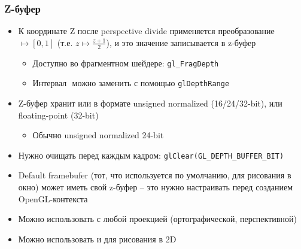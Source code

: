 \documentclass{beamer}
\begin{document}
\begin{frame}[fragile]
\frametitle{Z-буфер}
\begin{itemize}
\item К координате Z после perspective divide применяется преобразование \begin{math}[-1, 1] \mapsto [0, 1]\end{math} (т.е. \begin{math}z \mapsto \frac{z+1}{2}\end{math}), и это значение записывается в z-буфер
\pause
\begin{itemize}
\item Доступно во фрагментном шейдере: \verb|gl_FragDepth|
\pause
\item Интервал \begin{math}[0, 1]\end{math} можно заменить с помощью \verb|glDepthRange|
\end{itemize}
\pause
\item Z-буфер хранит или в формате unsigned normalized (16/24/32-bit), или floating-point (32-bit)
\begin{itemize}
\item Обычно unsigned normalized 24-bit
\end{itemize}
\pause
\item Нужно очищать перед каждым кадром: \verb|glClear(GL_DEPTH_BUFFER_BIT)|
\pause
\item Default framebufer (тот, что используется по умолчанию, для рисования в окно) может иметь свой z-буфер -- это нужно настраивать перед созданием OpenGL-контекста
\pause
\item Можно использовать с любой проекцией (ортографической, перспективной)
\item Можно использовать и для рисования в 2D
\end{itemize}
\end{frame}
\end{document}
